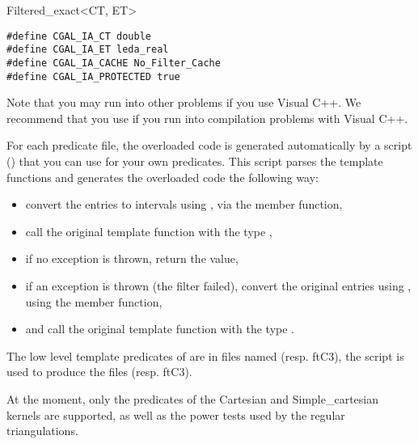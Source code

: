 \begin{ccClassTemplate}{Filtered_exact<CT, ET>}
\begin{verbatim} 
#define CGAL_IA_CT double
#define CGAL_IA_ET leda_real
#define CGAL_IA_CACHE No_Filter_Cache
#define CGAL_IA_PROTECTED true
\end{verbatim}

Note that you may run into other problems if you use Visual C++.  We recommend
that you use  if you run into compilation problems with
Visual C++.

For each predicate file, the overloaded code is generated automatically by a
 script () that you can
use for your own predicates.
This script parses the template functions and generates the
overloaded code the following way:
\begin{itemize}
\item convert the entries to intervals using
    , via the  member function,
\item call the original template function with the type
    ,
\item if no exception is thrown, return the value,
\item if an exception is thrown (the filter failed), convert the original
    entries using , using the  member
    function,
\item and call the original template function with the type .
\end{itemize}

\ccExample

The low level template predicates of {\cgal} are in files named
 (resp. ftC3), the script is used
to produce the files 
(resp. ftC3).

At the moment, only the predicates of the Cartesian and Simple\_cartesian
kernels are supported, as well as the power tests used by the regular
triangulations.

\end{ccClassTemplate}
